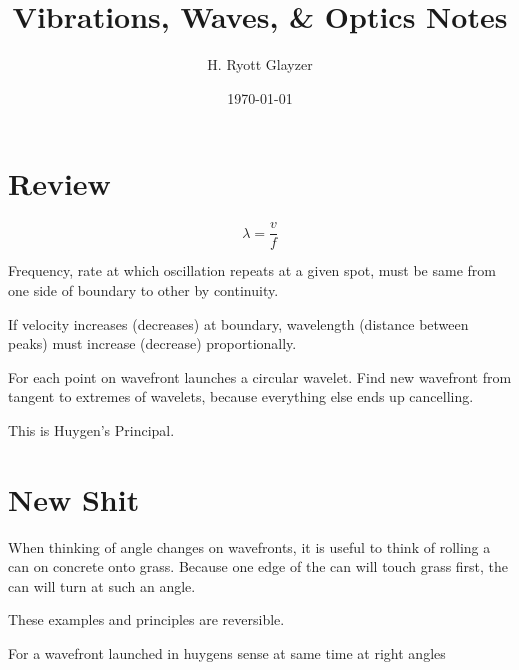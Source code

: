 \documentclass[12pt, letterpaper]{article}
\title{Vibrations, Waves, \& Optics Notes}
\author{H. Ryott Glayzer}
\date{\today}
\begin{document}
\maketitle
\section{Review}
\[
\lambda = \frac{v}{f}
\]

Frequency, rate at which oscillation repeats at a given spot,
must be same from one side of boundary to other by continuity.

If velocity increases (decreases) at boundary, wavelength
(distance between peaks) must increase (decrease) proportionally.

For each point on wavefront launches a circular wavelet.
Find new wavefront from tangent to extremes of wavelets,
because everything else ends up cancelling.

This is Huygen's Principal.

\section{New Shit}

When thinking of angle changes on wavefronts, it is useful
to think of rolling a can on concrete onto grass.
Because one edge of the can will touch grass first, the
can will turn at such an angle.

These examples and principles are reversible.


For a wavefront launched in huygens sense at same time at right angles
\end{document}
